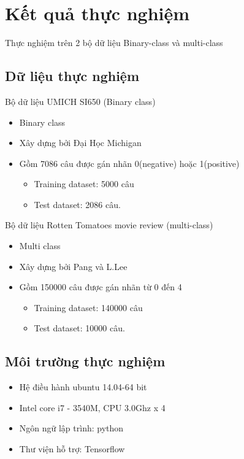 \chapter{Kết quả thực nghiệm}
\ifpdf
    \graphicspath{{Chapter3/Chapter3Figs/PNG/}{Chapter3/Chapter3Figs/PDF/}{Chapter3/Chapter3Figs/}}
\else
    \graphicspath{{Chapter3/Chapter3Figs/EPS/}{Chapter3/Chapter3Figs/}}
\fi
Thực nghiệm trên 2 bộ dữ liệu Binary-class và multi-class
\section{Dữ liệu thực nghiệm}
	Bộ dữ liệu UMICH SI650 (Binary class)
		\begin{itemize}[label = \textbullet]
			\item Binary class
			\item Xây dựng bởi Đại Học Michigan
			\item Gồm 7086 câu được gán nhãn 0(negative) hoặc 1(positive)
			\begin{itemize}[label =  \textendash]
				\item Training dataset: 5000 câu
				\item Test dataset: 2086 câu.
			\end{itemize}
		\end{itemize}
	Bộ dữ liệu Rotten Tomatoes movie review (multi-class)
		\begin{itemize}[label = \textbullet]
			\item Multi class
			\item Xây dựng bởi Pang và L.Lee
			\item Gồm 150000 câu được gán nhãn từ 0 đến 4
			\begin{itemize}[label =  \textendash]
				\item Training dataset: 140000 câu
				\item Test dataset: 10000 câu.
			\end{itemize}
		\end{itemize}
\section{Môi trường thực nghiệm}
\begin{itemize}[label = \textbullet]
		\item Hệ điều hành ubuntu 14.04-64 bit
		\item Intel core i7 - 3540M, CPU 3.0Ghz x 4
		\item Ngôn ngữ lập trình: python
		\item Thư viện hỗ trợ: Tensorflow
	\end{itemize}
